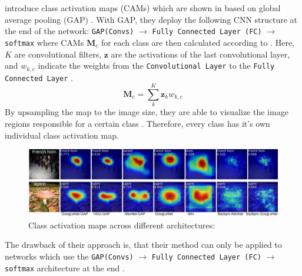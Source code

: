 \citet{ZhouKLOT16} introduce class activation maps (CAMs) which are shown in  based on global average pooling (GAP) \citep{LinCY13}. With GAP, they deploy the following CNN structure at the end of the network: \texttt{GAP(Convs)} $\rightarrow$ \texttt{Fully Connected Layer (FC)} $\rightarrow$ \texttt{softmax} where CAMs $\mathbf{M}_{c}$ for each class are then calculated according to . Here, $K$ are convolutional filters, $\mathbf{z}$ are the activations of the last convolutional layer, and $ w_{k, c}$ indicate the weights from the \texttt{Convolutional Layer} to the \texttt{Fully Connected Layer} \citep{ZhouKLOT16}.
\begin{equation}
\label{eq:cam}
    \mathbf{M}_{c}=\sum_{k}^{K} \mathbf{z}_k w_{k, c} 
\end{equation}
By upsampling the map to the image size, they are able to visualize the image regions responsible for a certain class \citep{ZhouKLOT16}. Therefore, every class has it's own individual class activation map. 
\begin{figure}[htbp]
    \centering
    \includegraphics[width=\textwidth]{Figures/Chapter3/heatmapAll.pdf}
    \caption[Class activation maps across different architectures]{Class activation maps across different architectures: \citep{ZhouKLOT16}}
    \label{fig:cams}
\end{figure}
The drawback of their approach is, that their method can only be applied to networks which use the \texttt{GAP(Convs)} $\rightarrow$ \texttt{Fully Connected Layer (FC)} $\rightarrow$ \texttt{softmax} architecture at the end \citep{xie2020explainable}. 

